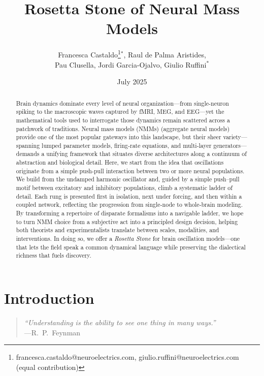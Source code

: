\documentclass[12pt]{article}
\title{Rosetta Stone of Neural Mass Models \\ }
\author{Francesca Castaldo\thanks{francesca.castaldo@neuroelectrics.com, giulio.ruffini@neuroelectrics.com (equal contribution)}$^*$, Raul de Palma Aristides, \\Pau Clusella, Jordi Garcia-Ojalvo, Giulio Ruffini$^*$}
\date{July 2025}
\numberwithin{equation}{section}
\begin{document}
\maketitle

\begin{abstract}
    Brain dynamics dominate every level of neural organization—from single-neuron spiking to the macroscopic waves captured by fMRI, MEG, and EEG—yet the mathematical tools used to interrogate those dynamics remain scattered across a patchwork of traditions. Neural mass models (NMMs) (aggregate neural models) provide one of the most popular gateways into this landscape, but their sheer variety---spanning lumped parameter models, firing‐rate equations, and multi‐layer generators--- demands a unifying framework that situates diverse architectures along a continuum of abstraction and biological detail. Here, we start from the idea that oscillations originate from a simple push-pull interaction between two or more neural populations. We build from the undamped harmonic oscillator and, guided by a simple push–pull motif between excitatory and inhibitory populations, climb a systematic ladder of detail.
    Each rung is presented first in isolation, next under forcing, and then within a coupled network, reflecting the progression from single‐node  to whole‐brain modeling. By transforming a repertoire of disparate formalisms into a navigable ladder, we hope to turn NMM choice from a subjective act into a principled design decision, helping both theorists and experimentalists translate between scales, modalities, and interventions. In doing so, we offer a \emph{Rosetta Stone} for brain oscillation models—one that lets the field speak a common dynamical language while preserving the dialectical richness that fuels discovery.
      
\end{abstract}

\clearpage
\setcounter{tocdepth}{2}
\tableofcontents

\clearpage


\section{Introduction} 

\begin{quote}
\emph{``Understanding is the ability to see one thing in many ways.''}\\[4pt]
\hfill ---R.~P.~Feynman
\end{quote}
\end{document}
